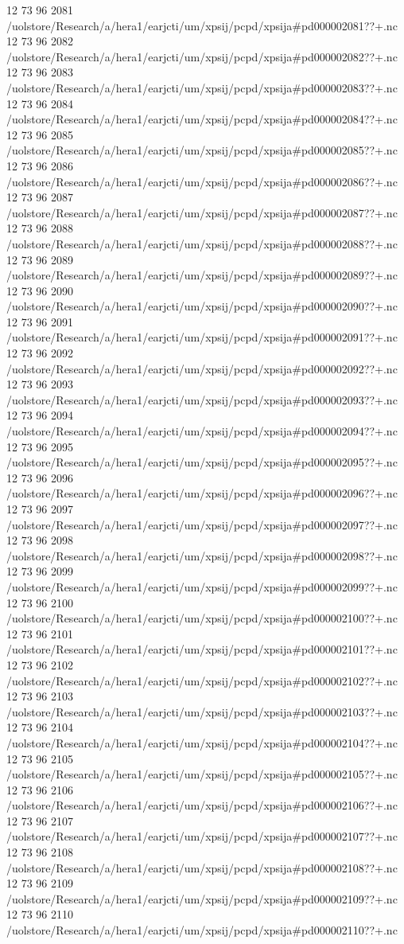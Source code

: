 12 73 96
2081
/uolstore/Research/a/hera1/earjcti/um/xpsij/pcpd/xpsija#pd000002081??+.nc
12 73 96
2082
/uolstore/Research/a/hera1/earjcti/um/xpsij/pcpd/xpsija#pd000002082??+.nc
12 73 96
2083
/uolstore/Research/a/hera1/earjcti/um/xpsij/pcpd/xpsija#pd000002083??+.nc
12 73 96
2084
/uolstore/Research/a/hera1/earjcti/um/xpsij/pcpd/xpsija#pd000002084??+.nc
12 73 96
2085
/uolstore/Research/a/hera1/earjcti/um/xpsij/pcpd/xpsija#pd000002085??+.nc
12 73 96
2086
/uolstore/Research/a/hera1/earjcti/um/xpsij/pcpd/xpsija#pd000002086??+.nc
12 73 96
2087
/uolstore/Research/a/hera1/earjcti/um/xpsij/pcpd/xpsija#pd000002087??+.nc
12 73 96
2088
/uolstore/Research/a/hera1/earjcti/um/xpsij/pcpd/xpsija#pd000002088??+.nc
12 73 96
2089
/uolstore/Research/a/hera1/earjcti/um/xpsij/pcpd/xpsija#pd000002089??+.nc
12 73 96
2090
/uolstore/Research/a/hera1/earjcti/um/xpsij/pcpd/xpsija#pd000002090??+.nc
12 73 96
2091
/uolstore/Research/a/hera1/earjcti/um/xpsij/pcpd/xpsija#pd000002091??+.nc
12 73 96
2092
/uolstore/Research/a/hera1/earjcti/um/xpsij/pcpd/xpsija#pd000002092??+.nc
12 73 96
2093
/uolstore/Research/a/hera1/earjcti/um/xpsij/pcpd/xpsija#pd000002093??+.nc
12 73 96
2094
/uolstore/Research/a/hera1/earjcti/um/xpsij/pcpd/xpsija#pd000002094??+.nc
12 73 96
2095
/uolstore/Research/a/hera1/earjcti/um/xpsij/pcpd/xpsija#pd000002095??+.nc
12 73 96
2096
/uolstore/Research/a/hera1/earjcti/um/xpsij/pcpd/xpsija#pd000002096??+.nc
12 73 96
2097
/uolstore/Research/a/hera1/earjcti/um/xpsij/pcpd/xpsija#pd000002097??+.nc
12 73 96
2098
/uolstore/Research/a/hera1/earjcti/um/xpsij/pcpd/xpsija#pd000002098??+.nc
12 73 96
2099
/uolstore/Research/a/hera1/earjcti/um/xpsij/pcpd/xpsija#pd000002099??+.nc
12 73 96
2100
/uolstore/Research/a/hera1/earjcti/um/xpsij/pcpd/xpsija#pd000002100??+.nc
12 73 96
2101
/uolstore/Research/a/hera1/earjcti/um/xpsij/pcpd/xpsija#pd000002101??+.nc
12 73 96
2102
/uolstore/Research/a/hera1/earjcti/um/xpsij/pcpd/xpsija#pd000002102??+.nc
12 73 96
2103
/uolstore/Research/a/hera1/earjcti/um/xpsij/pcpd/xpsija#pd000002103??+.nc
12 73 96
2104
/uolstore/Research/a/hera1/earjcti/um/xpsij/pcpd/xpsija#pd000002104??+.nc
12 73 96
2105
/uolstore/Research/a/hera1/earjcti/um/xpsij/pcpd/xpsija#pd000002105??+.nc
12 73 96
2106
/uolstore/Research/a/hera1/earjcti/um/xpsij/pcpd/xpsija#pd000002106??+.nc
12 73 96
2107
/uolstore/Research/a/hera1/earjcti/um/xpsij/pcpd/xpsija#pd000002107??+.nc
12 73 96
2108
/uolstore/Research/a/hera1/earjcti/um/xpsij/pcpd/xpsija#pd000002108??+.nc
12 73 96
2109
/uolstore/Research/a/hera1/earjcti/um/xpsij/pcpd/xpsija#pd000002109??+.nc
12 73 96
2110
/uolstore/Research/a/hera1/earjcti/um/xpsij/pcpd/xpsija#pd000002110??+.nc
